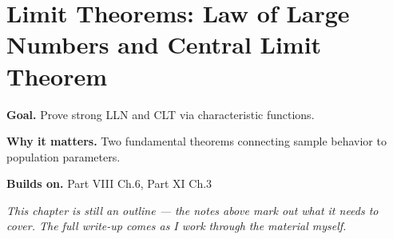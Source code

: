 \chapter{Limit Theorems: Law of Large Numbers and Central Limit Theorem}
\label{ch:11-probability-theory-05}

\begin{chapterintro}
\textbf{Goal.} Prove strong LLN and CLT via characteristic functions.

\textbf{Why it matters.} Two fundamental theorems connecting sample behavior to population parameters.

\textbf{Builds on.} Part VIII Ch.6, Part XI Ch.3
\end{chapterintro}

\textit{This chapter is still an outline --- the notes above mark out what it needs to cover. The full write-up comes as I work through the material myself.}
